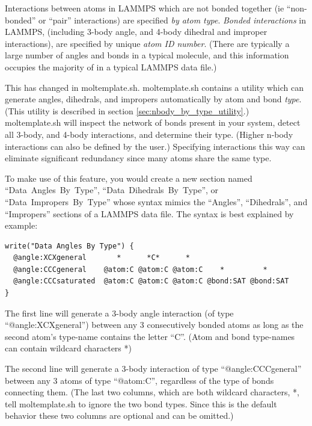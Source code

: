 \documentclass[11pt]{article}
\begin{document}
Interactions between atoms in LAMMPS which are not bonded together
(ie ``non-bonded'' or ``pair'' interactions) 
are specified \textit{by atom type}.
\textit{Bonded interactions} in LAMMPS, 
(including 3-body angle, and 4-body dihedral and improper interactions),
are specified by unique \textit{atom ID number}.
(There are typically a large number of angles and bonds in 
a typical molecule, and this information occupies the 
majority of in a typical LAMMPS data file.)

This has changed in moltemplate.sh.  moltemplate.sh contains a 
utility which can generate angles, dihedrals, and impropers
automatically by atom and bond \textit{type}.
(This utility is described in section \ref{sec:nbody_by_type_utility}.)
moltemplate.sh will inspect the network of bonds present in your system, 
detect all 3-body, and 4-body interactions, and determine their type.
(Higher n-body interactions can also be defined by the user.)
Specifying interactions this way can eliminate significant redundancy 
since many atoms share the same type. 

To make use of this feature, you would create a new section named
\mbox{``Data Angles By Type''}, \mbox{``Data Dihedrals By Type''}, 
or \mbox{``Data Impropers By Type''} 
whose syntax mimics the 
\mbox{``Angles''}, \mbox{``Dihedrals''}, and \mbox{``Impropers''} 
sections of a LAMMPS data file.
The syntax is best explained by example:

\begin{verbatim}
write("Data Angles By Type") {
  @angle:XCXgeneral       *      *C*      *
  @angle:CCCgeneral    @atom:C @atom:C @atom:C    *         *
  @angle:CCCsaturated  @atom:C @atom:C @atom:C @bond:SAT @bond:SAT
}
\end{verbatim}

The first line will generate a 3-body angle interaction 
(of type \mbox{``@angle:XCXgeneral''})
between any 3 consecutively bonded atoms 
as long as the second atom's type-name contains the letter ``C''.
(Atom and bond type-names can contain wildcard characters *)

The second line will generate a 3-body interaction 
of type \mbox{``@angle:CCCgeneral''}
between any 3 atoms of type \mbox{``@atom:C''},
regardless of the type of bonds connecting them.
(The last two columns, which are both wildcard characters, *, 
 tell moltemplate.sh to ignore the two bond types.
 Since this is the default behavior 
 these two columns are optional and can be omitted.)
\end{document}
